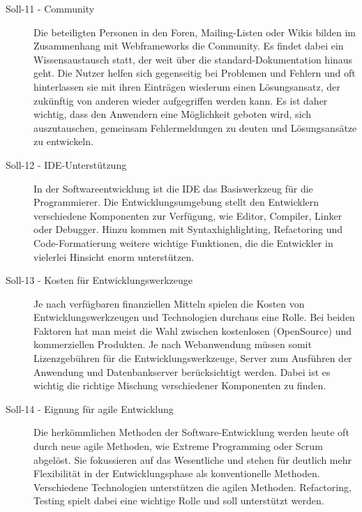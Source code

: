 \begin{description}
    \item[Soll-11 - Community\label{itm:Soll-11}]

    Die beteiligten Personen in den Foren, Mailing-Listen oder Wikis bilden im
    Zusammenhang mit Webframeworks die Community. Es findet dabei ein
    Wissensaustausch statt, der weit über die standard-Dokumentation hinaus
    geht. Die Nutzer helfen sich gegenseitig bei Problemen und Fehlern und oft
    hinterlassen sie mit ihren Einträgen wiederum einen Lösungsansatz, der
    zukünftig von anderen wieder aufgegriffen werden kann. Es ist daher 
    wichtig, dass den Anwendern eine Möglichkeit geboten wird, sich
    auszutauschen, gemeinsam Fehlermeldungen zu deuten und Lösungsansätze zu
    entwickeln.

    \item[Soll-12 - IDE-Unterstützung\label{itm:Soll-12}]

    In der Softwareentwicklung ist die IDE das Basiswerkzeug für die
    Programmierer. Die Entwicklungsumgebung stellt den Entwicklern verschiedene
    Komponenten zur Verfügung, wie Editor, Compiler, Linker oder Debugger.
    Hinzu kommen mit Syntaxhighlighting, Refactoring und Code-Formatierung
    weitere wichtige Funktionen, die die Entwickler in vielerlei Hinsicht enorm
    unterstützen.

    \item[Soll-13 - Kosten für Entwicklungswerkzeuge\label{itm:Soll-13}]

    Je nach verfügbaren finanziellen Mitteln spielen die Kosten von
    Entwicklungswerkzeugen und Technologien durchaus eine Rolle. Bei beiden
    Faktoren hat man meist die Wahl zwischen kostenlosen (OpenSource) und
    kommerziellen Produkten. Je nach Webanwendung müssen somit Lizenzgebühren
    für die Entwicklungswerkzeuge, Server zum Ausführen der Anwendung und
    Datenbankserver berücksichtigt werden. Dabei ist es wichtig die richtige
    Mischung verschiedener Komponenten zu finden.
  
    \item[Soll-14 - Eignung für agile Entwicklung\label{itm:Soll-14}]

    Die herkömmlichen Methoden der Software-Entwicklung werden heute oft durch
    neue agile Methoden, wie Extreme Programming oder Scrum abgelöst. Sie
    fokussieren auf das Wesentliche und stehen für deutlich mehr Flexibilität in
    der Entwicklungsphase als konventionelle Methoden. Verschiedene Technologien
    unterstützen die agilen Methoden. Refactoring, Testing spielt dabei eine
    wichtige Rolle und soll unterstützt werden.


\end{description}
